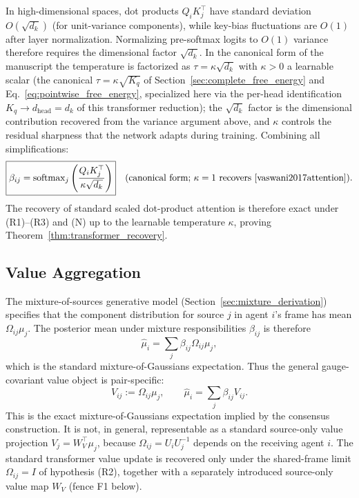 In high-dimensional spaces, dot products $Q_iK_j^\top$ have standard deviation $O(\sqrt{d_k})$ (for unit-variance components), while key-bias fluctuations are $O(1)$ after layer normalization. Normalizing pre-softmax logits to $O(1)$ variance therefore requires the dimensional factor $\sqrt{d_k}$. In the canonical form of the manuscript the temperature is factorized as $\tau = \kappa\sqrt{d_k}$ with $\kappa > 0$ a learnable scalar (the canonical $\tau = \kappa\sqrt{K_q}$ of Section~\ref{sec:complete_free_energy} and Eq.~\eqref{eq:pointwise_free_energy}, specialized here via the per-head identification $K_q \to d_{\mathrm{head}} = d_k$ of this transformer reduction); the $\sqrt{d_k}$ factor is the dimensional contribution recovered from the variance argument above, and $\kappa$ controls the residual sharpness that the network adapts during training. Combining all simplifications:
\begin{equation}
\boxed{\beta_{ij} = \mathrm{softmax}_j\left(\frac{Q_i K_j^\top}{\kappa\sqrt{d_k}}\right)}\quad\text{(canonical form; }\kappa=1\text{ recovers~\cite{vaswani2017attention}).}
\end{equation}
The recovery of standard scaled dot-product attention is therefore exact under (R1)--(R3) and (N) up to the learnable temperature $\kappa$, proving Theorem~\ref{thm:transformer_recovery}.

\subsection{Value Aggregation}\label{sec:value_aggregation_itfb}

The mixture-of-sources generative model (Section~\ref{sec:mixture_derivation}) specifies that the component distribution for source $j$ in agent $i$'s frame has mean $\Omega_{ij}\mu_j$. The posterior mean under mixture responsibilities $\beta_{ij}$ is therefore
\begin{equation}
\hat\mu_i = \sum_j \beta_{ij} \Omega_{ij}\mu_j,
\label{eq:glk_mixture_aggregation_itfb}
\end{equation}
which is the standard mixture-of-Gaussians expectation. Thus the general gauge-covariant value object is pair-specific:
\begin{equation}
V_{ij} := \Omega_{ij}\mu_j,
\qquad
\hat\mu_i = \sum_j \beta_{ij}V_{ij}.
\end{equation}
This is the exact mixture-of-Gaussians expectation implied by the consensus construction. It is not, in general, representable as a standard source-only value projection $V_j=W_V^\top\mu_j$, because $\Omega_{ij}=U_iU_j^{-1}$ depends on the receiving agent $i$. The standard transformer value update is recovered only under the shared-frame limit $\Omega_{ij}=I$ of hypothesis (R2), together with a separately introduced source-only value map $W_V$ (fence F1 below).

